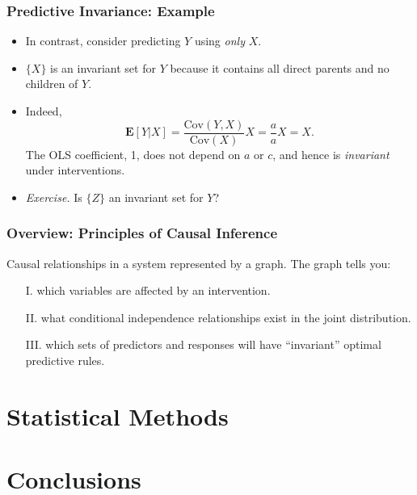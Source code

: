 \documentclass{beamer}
\newcommand{\E}{\textbf{E}}
\newcommand{\Cov}{\text{Cov}}
\begin{document}
\begin{frame}
\frametitle{Predictive Invariance: Example}
\begin{center}
\end{center}
\begin{itemize}
\item In contrast, consider predicting $Y$ using \emph{only} $X$.
\item $\{X\}$ is an invariant set for $Y$ because it contains all direct parents and no children of $Y$.
\item Indeed,
\[
\E[Y|X] = \frac{\Cov(Y, X)}{\Cov(X)} X = \frac{a}{a} X = X.
\]
The OLS coefficient, 1, does not depend on $a$ or $c$, and hence is \emph{invariant} under interventions.
\item \emph{Exercise.} Is $\{Z\}$ an invariant set for $Y$?
\end{itemize}
\end{frame}




\begin{frame}
\frametitle{Overview: Principles of Causal Inference}
Causal relationships in a system represented by a graph.  The graph tells you:
\begin{itemize}
\item[I.] which variables are affected by an intervention.
\item[II.] what conditional independence relationships exist in the joint distribution.
\item[III.] which sets of predictors and responses will have ``invariant'' optimal predictive rules.
\end{itemize}
\end{frame}

\section{Statistical Methods}
\sectionpage

\section{Conclusions}
\sectionpage
\end{document}
